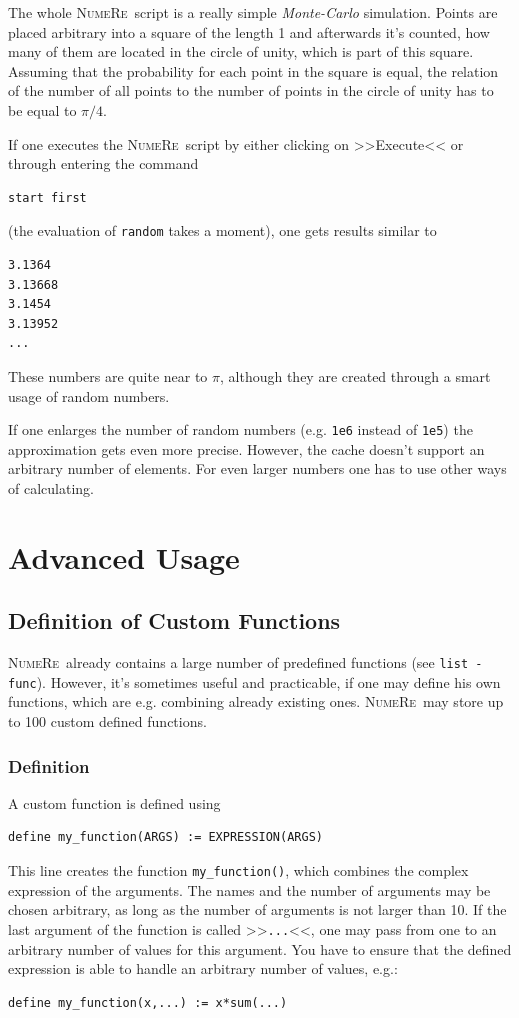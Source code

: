 \documentclass[DIV=14,headsepline,footsepline]{scrbook}
\newcommand{\NR}{\textsc{Nu\-me\-Re}}
\begin{document}
				The whole \NR\ script is a really simple \emph{Monte-Carlo} simulation. Points are placed arbitrary into a square of the length 1 and afterwards it's counted, how many of them are located in the circle of unity, which is part of this square. Assuming that the probability for each point in the square is equal, the relation of the number of all points to the number of points in the circle of unity has to be equal to $\pi/4$.
				
				If one executes the \NR\ script by either clicking on >>Execute<< or through entering the command
				\begin{lstlisting}
start first
				\end{lstlisting}
				(the evaluation of \lstinline+random+ takes a moment), one gets results similar to
				\begin{lstlisting}
3.1364
3.13668
3.1454
3.13952
...
				\end{lstlisting}
				These numbers are quite near to $\pi$, although they are created through a smart usage of random numbers.
				
				If one enlarges the number of random numbers (e.g. \lstinline+1e6+ instead of \lstinline+1e5+) the approximation gets even more precise. However, the cache doesn't support an arbitrary number of elements. For even larger numbers one has to use other ways of calculating.
	\part{Advanced Usage}
		\chapter{Definition of Custom Functions}
			\NR\ already contains a large number of predefined functions (see \lstinline+list -func+). However, it's sometimes useful and practicable, if one may define his own functions, which are e.g. combining already existing ones. \NR\ may store up to 100 custom defined functions.
			\section{Definition}
				A custom function is defined using
				\begin{lstlisting}
define my_function(ARGS) := EXPRESSION(ARGS)
				\end{lstlisting}
				This line creates the function \lstinline+my_function()+, which combines the complex expression of the arguments. The names and the number of arguments may be chosen arbitrary, as long as the number of arguments is not larger than 10. If the last argument of the function is called >>\lstinline+...+<<, one may pass from one to an arbitrary number of values for this argument. You have to ensure that the defined expression is able to handle an arbitrary number of values, e.g.:
				\begin{lstlisting}
define my_function(x,...) := x*sum(...)
				\end{lstlisting}
				
\end{document}
